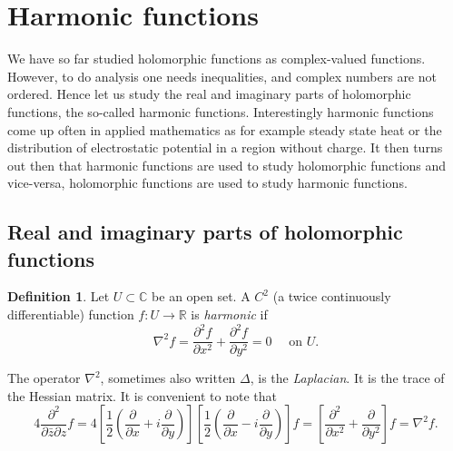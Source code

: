 \documentclass[12pt,openany]{book}
\newcommand{\C}{{\mathbb{C}}}
\newcommand{\R}{{\mathbb{R}}}
\newcommand{\myindex}[1]{#1\index{#1}}
\theoremstyle{plain}
\theoremstyle{remark}
\theoremstyle{definition}
\newtheorem{defn}[thm]{Definition}
\theoremstyle{exercise}
\theoremstyle{example}
\begin{document}

\section{Harmonic functions}
\label{sec:harmonic}

We have so far studied holomorphic functions as complex-valued functions.
However, to do analysis one needs inequalities, and complex numbers are not
ordered.  Hence let us study the real and imaginary parts of holomorphic
functions, the so-called harmonic functions.  Interestingly harmonic
functions come up often in applied mathematics as for example steady state
heat or the distribution of electrostatic potential in a region without
charge.  It then turns out then that harmonic functions are used to study
holomorphic functions and vice-versa, holomorphic functions are used to
study harmonic functions.

\subsection{Real and imaginary parts of holomorphic functions}

\begin{defn}
Let $U \subset \C$ be an open set.
A $C^2$ (a twice continuously differentiable) function $f \colon U \to \R$ is
\emph{\myindex{harmonic}} if
\begin{equation*}
\nabla^2 f =
\frac{\partial^2 f}{\partial x^2} +
\frac{\partial^2 f}{\partial y^2} = 0
\quad \text{ on $U$.}
\end{equation*}
\end{defn}

The operator $\nabla^2$, sometimes also written $\Delta$,
is the \emph{\myindex{Laplacian}}.
It is the trace of the Hessian matrix.  It is convenient 
to note that
\begin{equation*}
4
\frac{\partial^2}{\partial \bar{z}\partial z} f =
4
\left[
\frac{1}{2}
\left(
\frac{\partial}{\partial x} + i
\frac{\partial}{\partial y}
\right)
\right]
\left[
\frac{1}{2}
\left(
\frac{\partial}{\partial x} - i
\frac{\partial}{\partial y}
\right)
\right]
f
=
\left[
\frac{\partial^2}{\partial x^2} +
\frac{\partial}{\partial y^2}
\right]
f
=
\nabla^2 f .
\end{equation*}
\end{document}
